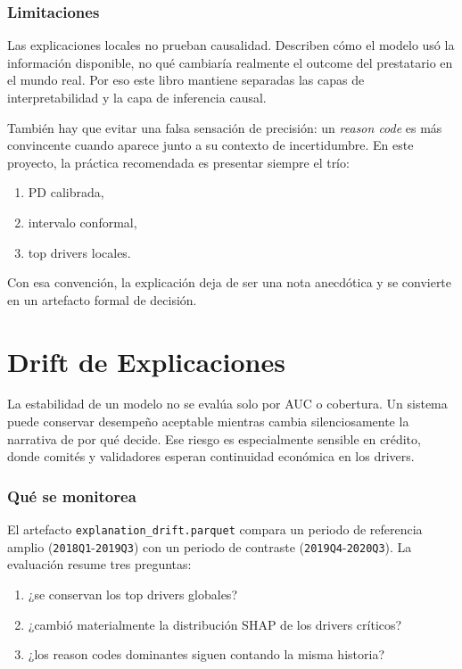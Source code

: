 \documentclass[
  spanish,
  11pt,
  letterpaper,
]{scrbook}
\providecommand{\tightlist}{%
  \setlength{\itemsep}{0pt}\setlength{\parskip}{0pt}}
\theoremstyle{plain}
\theoremstyle{remark}
\begin{document}
\subsection{Limitaciones}\label{limitaciones}

Las explicaciones locales no prueban causalidad. Describen cómo el
modelo usó la información disponible, no qué cambiaría realmente el
outcome del prestatario en el mundo real. Por eso este libro mantiene
separadas las capas de interpretabilidad y la capa de inferencia causal.

También hay que evitar una falsa sensación de precisión: un \emph{reason
code} es más convincente cuando aparece junto a su contexto de
incertidumbre. En este proyecto, la práctica recomendada es presentar
siempre el trío:

\begin{enumerate}
\def\labelenumi{\arabic{enumi}.}
\tightlist
\item
  PD calibrada,
\item
  intervalo conformal,
\item
  top drivers locales.
\end{enumerate}

Con esa convención, la explicación deja de ser una nota anecdótica y se
convierte en un artefacto formal de decisión.

\chapter{Drift de Explicaciones}\label{sec-explanation-drift}

La estabilidad de un modelo no se evalúa solo por AUC o cobertura. Un
sistema puede conservar desempeño aceptable mientras cambia
silenciosamente la narrativa de por qué decide. Ese riesgo es
especialmente sensible en crédito, donde comités y validadores esperan
continuidad económica en los drivers.

\subsection{Qué se monitorea}\label{quuxe9-se-monitorea}

El artefacto \texttt{explanation\_drift.parquet} compara un periodo de
referencia amplio (\texttt{2018Q1}-\texttt{2019Q3}) con un periodo de
contraste (\texttt{2019Q4}-\texttt{2020Q3}). La evaluación resume tres
preguntas:

\begin{enumerate}
\def\labelenumi{\arabic{enumi}.}
\tightlist
\item
  ¿se conservan los top drivers globales?
\item
  ¿cambió materialmente la distribución SHAP de los drivers críticos?
\item
  ¿los reason codes dominantes siguen contando la misma historia?
\end{enumerate}
\end{document}
